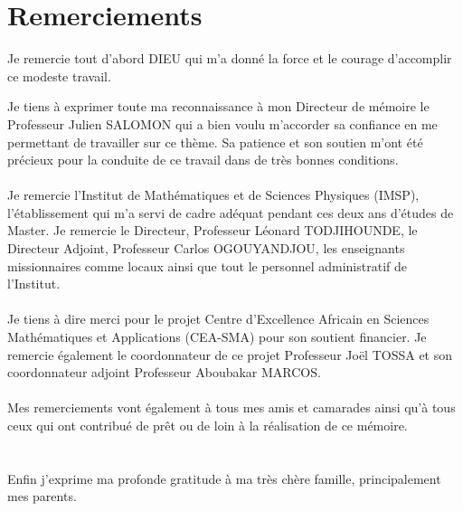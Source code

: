 \chapter*{Remerciements}
\begin{flushleft}
Je remercie tout d'abord DIEU qui m'a donné la force et le courage d'accomplir ce modeste travail.
\end{flushleft}
\[\]
Je tiens à exprimer toute ma reconnaissance à mon Directeur de mémoire le Professeur Julien SALOMON qui a bien voulu m'accorder sa confiance en me permettant de travailler sur ce thème. Sa patience et son soutien m'ont été précieux pour la conduite de ce travail dans de très bonnes conditions.\\\\
Je remercie l'Institut de Mathématiques et de Sciences Physiques (IMSP), l'établissement qui m'a servi de cadre adéquat pendant ces deux ans d'études de Master. Je remercie le Directeur, Professeur Léonard TODJIHOUNDE, le Directeur Adjoint, Professeur Carlos OGOUYANDJOU, les enseignants missionnaires comme locaux ainsi que tout le personnel administratif de l'Institut.\\\\
Je tiens à dire merci pour le projet Centre d'Excellence Africain en Sciences Mathématiques et Applications (CEA-SMA) pour son soutient financier. Je remercie également le coordonnateur de ce projet Professeur Joël TOSSA et son coordonnateur adjoint Professeur Aboubakar MARCOS.\\\\
Mes remerciements vont également à tous mes amis et camarades ainsi qu'à tous ceux qui ont contribué de prêt ou de loin à la réalisation de ce mémoire.\\\\\\
Enfin j'exprime ma profonde gratitude à ma très chère famille, principalement mes parents.